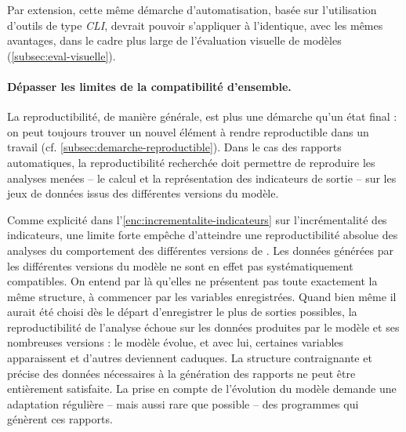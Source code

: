 Par extension, cette même démarche d'automatisation, basée sur l'utilisation d'outils de type \textit{CLI}, devrait pouvoir s'appliquer à l'identique, avec les mêmes avantages, dans le cadre plus large de l'évaluation visuelle de modèles (\cref{subsec:eval-visuelle}).

%
%


\paragraph{Dépasser les limites de la compatibilité d'ensemble.\label{par:compatibilites-generations}}
La reproductibilité, de manière générale, est plus une démarche qu'un état final : on peut toujours trouver un nouvel élément à \og rendre reproductible\fg{} dans un travail (cf. \cref{subsec:demarche-reproductible}).
Dans le cas des rapports automatiques, la reproductibilité recherchée doit permettre de reproduire les analyses menées -- le calcul et la représentation des indicateurs de sortie -- sur les jeux de données issus des différentes versions du modèle.

Comme explicité dans l'\cref{enc:incrementalite-indicateurs} sur l'incrémentalité des indicateurs, une limite forte empêche d'atteindre une reproductibilité absolue des analyses du comportement des différentes versions de \simfeodal{}.
Les données générées par les différentes versions du modèle ne sont en effet pas systématiquement compatibles.
On entend par là qu'elles ne présentent pas toute exactement la même structure, à commencer par les variables enregistrées.
Quand bien même il aurait été choisi dès le départ d'enregistrer le plus de sorties possibles, la reproductibilité de l'analyse échoue sur les données produites par le modèle et ses nombreuses versions : le modèle évolue, et avec lui, certaines variables apparaissent et d'autres deviennent caduques.
La structure contraignante et précise des données nécessaires à la génération des rapports ne peut être entièrement satisfaite.
La prise en compte de l'évolution du modèle demande une adaptation régulière -- mais aussi rare que possible -- des programmes qui génèrent ces rapports.

